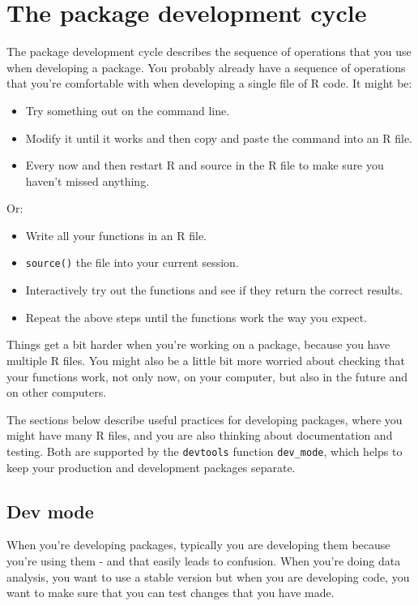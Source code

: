 \chapter{The package development cycle}

The package development cycle describes the sequence of operations that
you use when developing a package. You probably already have a sequence
of operations that you're comfortable with when developing a single file
of R code. It might be:

\begin{itemize}
\item
  Try something out on the command line.
\item
  Modify it until it works and then copy and paste the command into an R
  file.
\item
  Every now and then restart R and source in the R file to make sure you
  haven't missed anything.
\end{itemize}

Or:

\begin{itemize}
\item
  Write all your functions in an R file.
\item
  \texttt{source()} the file into your current session.
\item
  Interactively try out the functions and see if they return the correct
  results.
\item
  Repeat the above steps until the functions work the way you expect.
\end{itemize}

Things get a bit harder when you're working on a package, because you
have multiple R files. You might also be a little bit more worried about
checking that your functions work, not only now, on your computer, but
also in the future and on other computers.

The sections below describe useful practices for developing packages,
where you might have many R files, and you are also thinking about
documentation and testing. Both are supported by the \texttt{devtools}
function \texttt{dev\_mode}, which helps to keep your production and
development packages separate.

\section{Dev mode}

When you're developing packages, typically you are developing them
because you're using them - and that easily leads to confusion. When
you're doing data analysis, you want to use a stable version but when
you are developing code, you want to make sure that you can test changes
that you have made.

